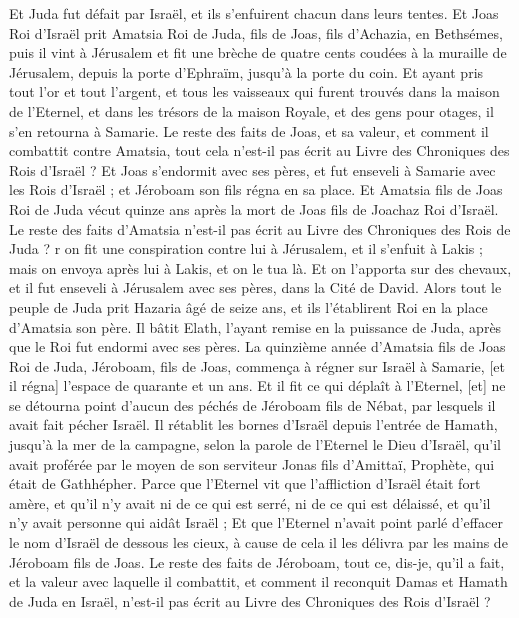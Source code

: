 \begin{multicols}{2}
Et Juda fut défait par Israël, et ils s'enfuirent chacun dans leurs tentes.
Et Joas Roi d'Israël prit Amatsia Roi de Juda, fils de Joas, fils d'Achazia, en Bethsémes, puis il vint à Jérusalem et fit une brèche de quatre cents coudées à la muraille de Jérusalem, depuis la porte d'Ephraïm, jusqu'à la porte du coin.
Et ayant pris tout l'or et tout l'argent, et tous les vaisseaux qui furent trouvés dans la maison de l'Eternel, et dans les trésors de la maison Royale, et des gens pour otages, il s'en retourna à Samarie.
Le reste des faits de Joas, et sa valeur, et comment il combattit contre Amatsia, tout cela n'est-il pas écrit au Livre des Chroniques des Rois d'Israël ?
Et Joas s'endormit avec ses pères, et fut enseveli à Samarie avec les Rois d'Israël ; et Jéroboam son fils régna en sa place.
Et Amatsia fils de Joas Roi de Juda vécut quinze ans après la mort de Joas fils de Joachaz Roi d'Israël.
Le reste des faits d'Amatsia n'est-il pas écrit au Livre des Chroniques des Rois de Juda ?
r on fit une conspiration contre lui à Jérusalem, et il s'enfuit à Lakis ; mais on envoya après lui à Lakis, et on le tua là.
Et on l'apporta sur des chevaux, et il fut enseveli à Jérusalem avec ses pères, dans la Cité de David.
Alors tout le peuple de Juda prit Hazaria âgé de seize ans, et ils l'établirent Roi en la place d'Amatsia son père.
Il bâtit Elath, l'ayant remise en la puissance de Juda, après que le Roi fut endormi avec ses pères.
La quinzième année d'Amatsia fils de Joas Roi de Juda, Jéroboam, fils de Joas, commença à régner sur Israël à Samarie, [et il régna] l'espace de quarante et un ans.
Et il fit ce qui déplaît à l'Eternel, [et] ne se détourna point d'aucun des péchés de Jéroboam fils de Nébat, par lesquels il avait fait pécher Israël.
Il rétablit les bornes d'Israël depuis l'entrée de Hamath, jusqu'à la mer de la campagne, selon la parole de l'Eternel le Dieu d'Israël, qu'il avait proférée par le moyen de son serviteur Jonas fils d'Amittaï, Prophète, qui était de Gathhépher.
Parce que l'Eternel vit que l'affliction d'Israël était fort amère, et qu'il n'y avait ni de ce qui est serré, ni de ce qui est délaissé, et qu'il n'y avait personne qui aidât Israël ;
Et que l'Eternel n'avait point parlé d'effacer le nom d'Israël de dessous les cieux, à cause de cela il les délivra par les mains de Jéroboam fils de Joas.
Le reste des faits de Jéroboam, tout ce, dis-je, qu'il a fait, et la valeur avec laquelle il combattit, et comment il reconquit Damas et Hamath de Juda en Israël, n'est-il pas écrit au Livre des Chroniques des Rois d'Israël ?

\end{multicols}
